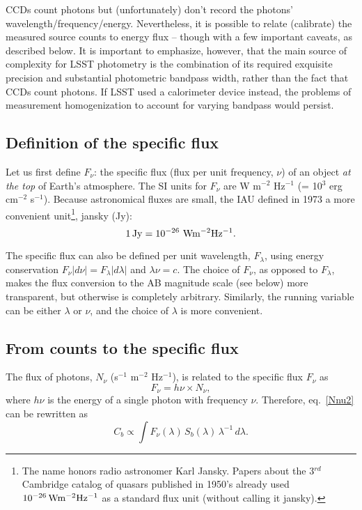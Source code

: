 \documentclass[DM,lsstdraft,toc,usenatbib]{lsstdoc}
\begin{document}
CCDs count photons but (unfortunately) don't record the photons' wavelength/frequency/energy.
Nevertheless, it is possible to relate (calibrate) the measured source counts to energy flux -- though
with a few important caveats, as described below. It is important to emphasize, however, that the main
source of complexity for LSST photometry is the combination of its required exquisite precision
and substantial photometric bandpass width, rather than the fact that CCDs count photons. If LSST
used a calorimeter device instead, the problems of measurement homogenization to account for varying
bandpass would persist.



\subsection{Definition of the specific flux}

Let us first  define $F_\nu$: the specific flux (flux per unit frequency, $\nu$) of an
object {\it at the top} of Earth's atmosphere. The SI units for $F_\nu$ are
W m$^{-2}$ Hz$^{-1}$ (= 10$^{3}$ erg cm$^{-2}$ s$^{-1}$). Because astronomical
fluxes are small, the IAU defined in 1973 a more convenient unit\footnote{The
name honors radio astronomer Karl Jansky. Papers about the 3$^{rd}$ Cambridge
catalog of quasars published in 1950's already used $10^{-26} \, {\rm W m^{-2} Hz^{-1}}$
as a standard flux unit (without calling it jansky).},  jansky (Jy):
\begin{equation}
            1 \, {\rm Jy} = 10^{-26} \,\, {\rm W m^{-2} Hz^{-1}}.
\end{equation}

The specific flux can also be defined per unit wavelength, $F_\lambda$, using energy
conservation $F_\nu |d\nu|=F_\lambda |d\lambda|$ and $\lambda \nu = c$.
The choice of $F_\nu$, as opposed to $F_\lambda$, makes the flux conversion
to the AB magnitude scale (see below) more transparent, but otherwise is completely
arbitrary. Similarly, the running variable can be either  $\lambda$ or $\nu$, and the
choice of $\lambda$ is more convenient.



\subsection{From counts to the specific flux}

The flux of photons, $N_\nu$ (s$^{-1}$ m$^{-2}$ Hz$^{-1}$), is related to the specific flux $F_\nu$ as
\begin{equation}
\label{FNnu}
                 F_\nu = h \nu \times N_\nu,
\end{equation}
where $h\nu$ is the energy of a single photon with frequency $\nu$. Therefore,
eq.~\ref{Nnu2} can be rewritten as
\begin{equation}
\label{Nnu3}
         C_b\propto \int F_\nu(\lambda) \, S_b(\lambda) \, \lambda^{-1} \, d\lambda.
\end{equation}
\end{document}
